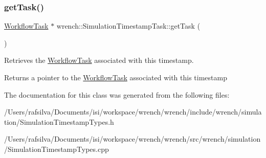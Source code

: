 \subsubsection{\texorpdfstring{get\+Task()}{getTask()}}
{\footnotesize\ttfamily \hyperlink{classwrench_1_1_workflow_task}{Workflow\+Task} $\ast$ wrench\+::\+Simulation\+Timestamp\+Task\+::get\+Task (\begin{DoxyParamCaption}{ }\end{DoxyParamCaption})}



Retrieves the \hyperlink{classwrench_1_1_workflow_task}{Workflow\+Task} associated with this timestamp. 

\begin{DoxyReturn}{Returns}
a pointer to the \hyperlink{classwrench_1_1_workflow_task}{Workflow\+Task} associated with this timestamp 
\end{DoxyReturn}


The documentation for this class was generated from the following files\+:\begin{DoxyCompactItemize}
\item 
/\+Users/rafsilva/\+Documents/isi/workspace/wrench/wrench/include/wrench/simulation/Simulation\+Timestamp\+Types.\+h\item 
/\+Users/rafsilva/\+Documents/isi/workspace/wrench/wrench/src/wrench/simulation/Simulation\+Timestamp\+Types.\+cpp\end{DoxyCompactItemize}
